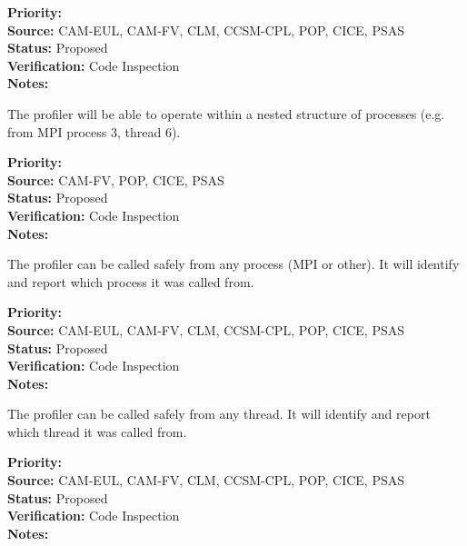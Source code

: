 \begin{reqlist}
{\bf Priority:}  \\
{\bf Source:} CAM-EUL, CAM-FV, CLM, CCSM-CPL, POP, CICE, PSAS \\
{\bf Status:} Proposed \\
{\bf Verification:} Code Inspection \\
{\bf Notes:} 
\end{reqlist}


The profiler will be able to operate within a nested structure of processes (e.g.
from MPI process 3, thread 6).

\begin{reqlist}
{\bf Priority:}  \\
{\bf Source:}  CAM-FV, POP, CICE, PSAS \\
{\bf Status:} Proposed \\
{\bf Verification:} Code Inspection \\
{\bf Notes:} 
\end{reqlist}


The profiler can be called safely from any process (MPI or other).  It will 
identify and report which process it was called from.

\begin{reqlist}
{\bf Priority:}  \\
{\bf Source:} CAM-EUL, CAM-FV, CLM, CCSM-CPL, POP, CICE, PSAS \\
{\bf Status:} Proposed \\
{\bf Verification:} Code Inspection \\
{\bf Notes:} 
\end{reqlist}


The profiler can be called safely from any thread.  It will 
identify and report which thread it was called from.

\begin{reqlist}
{\bf Priority:}  \\
{\bf Source:} CAM-EUL, CAM-FV, CLM, CCSM-CPL, POP, CICE, PSAS \\
{\bf Status:} Proposed \\
{\bf Verification:} Code Inspection \\
{\bf Notes:} 
\end{reqlist}


